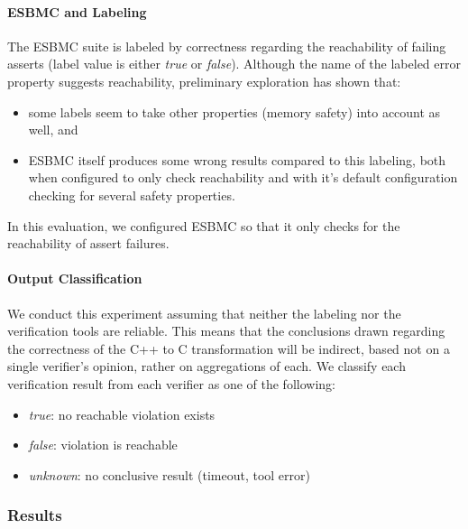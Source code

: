 \paragraph{ESBMC and Labeling} %
The ESBMC suite is labeled by correctness regarding the reachability of failing asserts (label value is either \textit{true} or \textit{false}). %
Although the name of the labeled error property suggests reachability, preliminary exploration has shown that:
\begin{itemize}
  \item some labels seem to take other properties (\eg memory safety) into account as well, and
  \item ESBMC itself produces some wrong results compared to this labeling, both when configured to only check reachability and with it's default configuration checking for several safety properties.
\end{itemize}
In this evaluation, we configured ESBMC so that it only checks for the reachability of assert failures. %

\paragraph{Output Classification}
We conduct this experiment assuming that neither the labeling nor the verification tools are reliable. %
This means that the conclusions drawn regarding the correctness of the C++ to C transformation will be indirect, based not on a single verifier's opinion, rather on aggregations of each. %
We classify each verification result from each verifier as one of the following:
\begin{itemize}
  \item \textit{true}: no reachable violation exists
  \item \textit{false}: violation is reachable
  \item \textit{unknown}: no conclusive result (\eg timeout, tool error)
\end{itemize}



\subsubsection{Results}

